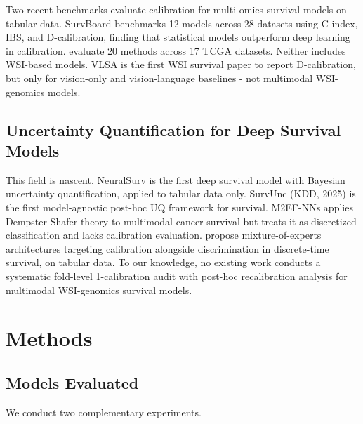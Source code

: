 \documentclass[pmlr]{jmlr}
\begin{document}
Two recent benchmarks evaluate calibration for multi-omics survival models on tabular data. SurvBoard \citep{wissel2025survboard} benchmarks 12 models across 28 datasets using C-index, IBS, and D-calibration, finding that statistical models outperform deep learning in calibration. \citet{tran2025comprehensive} evaluate 20 methods across 17 TCGA datasets. Neither includes WSI-based models. VLSA \citep{liu2025vlsa} is the first WSI survival paper to report D-calibration, but only for vision-only and vision-language baselines - not multimodal WSI-genomics models.

\subsection{Uncertainty Quantification for Deep Survival Models}

This field is nascent. NeuralSurv \citep{monod2025neuralsurv} is the first deep survival model with Bayesian uncertainty quantification, applied to tabular data only. SurvUnc (KDD, 2025) is the first model-agnostic post-hoc UQ framework for survival. M2EF-NNs \citep{luo2025m2ef} applies Dempster-Shafer theory to multimodal cancer survival but treats it as discretized classification and lacks calibration evaluation. \citet{morrill2025experts} propose mixture-of-experts architectures targeting calibration alongside discrimination in discrete-time survival, on tabular data. To our knowledge, no existing work conducts a systematic fold-level 1-calibration audit with post-hoc recalibration analysis for multimodal WSI-genomics survival models.

\section{Methods}

\subsection{Models Evaluated}

We conduct two complementary experiments.
\end{document}

